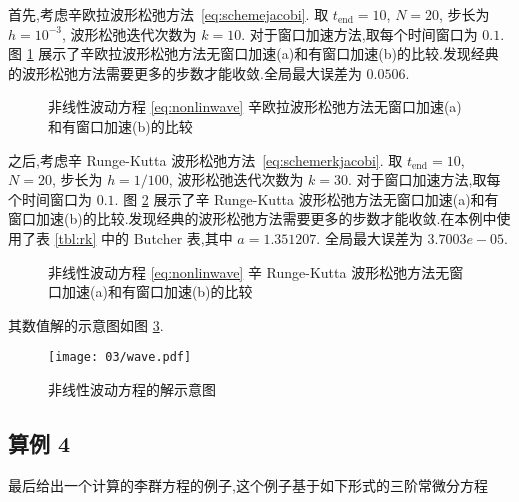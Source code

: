 首先,考虑辛欧拉波形松弛方法~\eqref{eq:schemejacobi}. 取 $t_{\text{end}} = 10$, $N=20$, 步长为 $h = 10^{-3}$, 波形松弛迭代次数为 $k=10$. 对于窗口加速方法,取每个时间窗口为 $0.1$. 图 \ref{fig:ex3seucom} 展示了辛欧拉波形松弛方法无窗口加速(a)和有窗口加速(b)的比较.发现经典的波形松弛方法需要更多的步数才能收敛.全局最大误差为 $0.0506$.

\begin{figure}[h!]
  \centering
  \caption{非线性波动方程 \eqref{eq:nonlinwave} 辛欧拉波形松弛方法无窗口加速(a)和有窗口加速(b)的比较}
  \label{fig:ex3seucom}
\end{figure}

之后,考虑辛 Runge-Kutta 波形松弛方法~\eqref{eq:schemerkjacobi}. 取 $t_{\text{end}} = 10$, $N=20$, 步长为 $h = 1/100$, 波形松弛迭代次数为 $k=30$. 对于窗口加速方法,取每个时间窗口为 $0.1$. 图 \ref{fig:ex3srkcom} 展示了辛 Runge-Kutta 波形松弛方法无窗口加速(a)和有窗口加速(b)的比较.发现经典的波形松弛方法需要更多的步数才能收敛.在本例中使用了表 \ref{tbl:rk} 中的 Butcher 表,其中 $a = 1.351207$. 全局最大误差为 $3.7003e-05$.

\begin{figure}[h!]
  \centering
  \caption{非线性波动方程 \eqref{eq:nonlinwave} 辛 Runge-Kutta 波形松弛方法无窗口加速(a)和有窗口加速(b)的比较}
  \label{fig:ex3srkcom}
\end{figure}

其数值解的示意图如图 \ref{fig:wavefig}.

\begin{figure}[h!]
  \centering
  \texttt{[image: 03/wave.pdf]}
  \caption{非线性波动方程的解示意图}
  \label{fig:wavefig}
\end{figure}

\subsection*{算例 4}
最后给出一个计算的李群方程的例子,这个例子基于如下形式的三阶常微分方程

